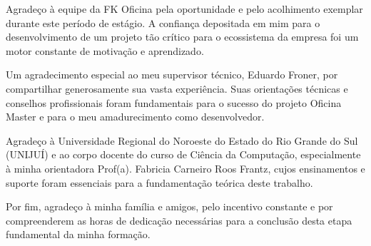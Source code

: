 
\begin{agradecimentos}

Agradeço à equipe da FK Oficina pela oportunidade e pelo acolhimento exemplar durante este período de estágio. A confiança depositada em mim para o desenvolvimento de um projeto tão crítico para o ecossistema da empresa foi um motor constante de motivação e aprendizado.

Um agradecimento especial ao meu supervisor técnico, Eduardo Froner, por compartilhar generosamente sua vasta experiência. Suas orientações técnicas e conselhos profissionais foram fundamentais para o sucesso do projeto Oficina Master e para o meu amadurecimento como desenvolvedor.

Agradeço à Universidade Regional do Noroeste do Estado do Rio Grande do Sul (UNIJUÍ) e ao corpo docente do curso de Ciência da Computação, especialmente à minha orientadora Prof(a). Fabricia Carneiro Roos Frantz, cujos ensinamentos e suporte foram essenciais para a fundamentação teórica deste trabalho.

Por fim, agradeço à minha família e amigos, pelo incentivo constante e por compreenderem as horas de dedicação necessárias para a conclusão desta etapa fundamental da minha formação.

\end{agradecimentos}
